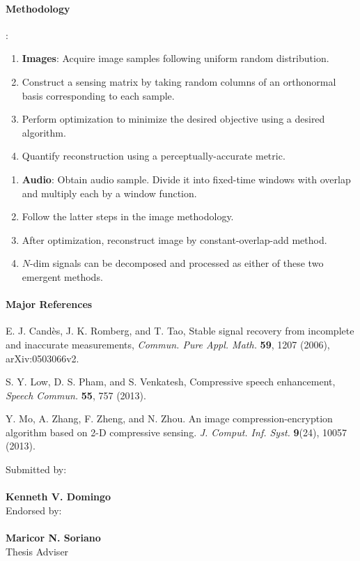 \documentclass[11pt,oneside]{article}
\newlength\Colsep
\begin{document}
\paragraph{Methodology}:\medskip \\
\begin{minipage}{\textwidth}
	\begin{minipage}[c][][c]{\dimexpr0.5\textwidth-0.5\Colsep\relax}
		\begin{enumerate}
			\item \textbf{Images}: Acquire image samples following uniform random distribution.
			\item Construct a sensing matrix by taking random columns of an orthonormal basis corresponding to each sample.
			\item Perform optimization to minimize the desired objective using a desired algorithm.
			\item Quantify reconstruction using a perceptually-accurate metric.
		\end{enumerate}
	\end{minipage}\hfill
	\begin{minipage}[c][][c]{\dimexpr0.5\textwidth-0.5\Colsep\relax}
		\begin{enumerate}
			\item \textbf{Audio}: Obtain audio sample. Divide it into fixed-time windows with overlap and multiply each by a window function.
			\item Follow the latter steps in the image methodology.
			\item After optimization, reconstruct image by constant-overlap-add method.
			\item $N$-dim signals can be decomposed and processed as either of these two emergent methods.
		\end{enumerate}		
	\end{minipage}
\end{minipage}

\paragraph{Major References}
\begin{enumerate}[label={[\arabic*]}]
	\item E. J. Cand\`{e}s, J. K. Romberg, and T. Tao, Stable signal recovery from incomplete and inaccurate measurements, \textit{Commun. Pure Appl. Math.} \textbf{59}, 1207 (2006), arXiv:0503066v2.
	\item S. Y. Low, D. S. Pham, and S. Venkatesh, Compressive speech enhancement, \textit{Speech Commun.} \textbf{55}, 757 (2013).
	\item Y. Mo, A. Zhang, F. Zheng, and N. Zhou. An image compression-encryption algorithm based on 2-D compressive sensing. \textit{J. Comput. Inf. Syst.} \textbf{9}(24), 10057 (2013).
\end{enumerate}

\bigskip

Submitted by: \\
\smallskip \\
\textbf{Kenneth V. Domingo} \\

Endorsed by: \\
\smallskip \\
\textbf{Maricor N. Soriano} \\
Thesis Adviser
\end{document}
